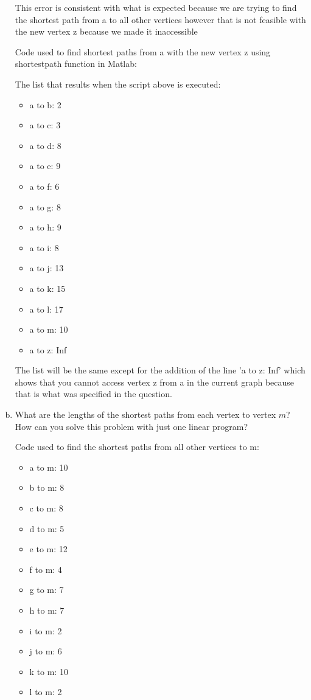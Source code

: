 \documentclass[../report/main.tex]{subfiles}
\begin{document}
\begin{enumerate}[a)]
    This error is consistent with what is expected because we are trying to find the shortest path from a to all other vertices however that is not feasible with the new vertex z because we made it inaccessible

    Code used to find shortest paths from a with the new vertex z using shortestpath function in Matlab:
  
    

    The list that results when the script above is executed:

    \begin{itemize}
        \item a to b: 2
        \item a to c: 3
        \item a to d: 8
        \item a to e: 9
        \item a to f: 6
        \item a to g: 8
        \item a to h: 9
        \item a to i: 8
        \item a to j: 13
        \item a to k: 15
        \item a to l: 17
        \item a to m: 10
        \item a to z: Inf
    \end{itemize}

    The list will be the same except for the addition of the line 'a to z: Inf' which shows that you cannot access vertex z from a in the current graph because that is what was specified in the question.

	\item What are the lengths of the shortest paths from each vertex to vertex $m$? How can you solve this problem with just one linear program?

    Code used to find the shortest paths from all other vertices to m:

    

    \begin{itemize}
        \item a to m: 10
        \item b to m: 8
        \item c to m: 8
        \item d to m: 5
        \item e to m: 12
        \item f to m: 4
        \item g to m: 7
        \item h to m: 7
        \item i to m: 2
        \item j to m: 6
        \item k to m: 10
        \item l to m: 2
    \end{itemize}


\end{enumerate}
\end{document}
